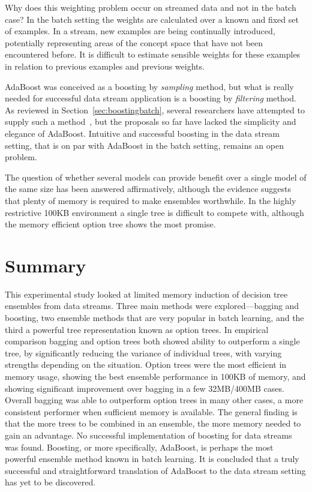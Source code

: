 Why does this weighting problem occur on streamed data and not in the batch case? In the batch setting the weights are calculated over a known and fixed set of examples. In a stream, new examples are being continually introduced, potentially representing areas of the concept space that have not been encountered before. It is difficult to estimate sensible weights for these examples in relation to previous examples and previous weights.

AdaBoost was conceived as a boosting by {\em sampling} method, but what is really needed for successful data stream application is a boosting by {\em filtering} method. As reviewed in Section~\ref{sec:boostingbatch}, several researchers have attempted to supply such a method~\cite{madaboost, polyboost}, but the proposals so far have lacked the simplicity and elegance of AdaBoost. Intuitive and successful boosting in the data stream setting, that is on par with AdaBoost in the batch setting, remains an open problem.

The question of whether several models can provide benefit over a single model of the same size has been answered affirmatively, although the evidence suggests that plenty of memory is required to make ensembles worthwhile. In the highly restrictive 100KB environment a single tree is difficult to compete with, although the memory efficient option tree shows the most promise.

\section{Summary}

This experimental study looked at limited memory induction of decision tree ensembles from data streams.
Three main methods were explored---bagging and boosting, two ensemble methods that are very popular in batch learning, and the third a powerful tree representation known as option trees.
In empirical comparison bagging and option trees both showed ability to outperform a single tree, by significantly reducing the variance of individual trees, with varying strengths depending on the situation. Option trees were the most efficient in memory usage, showing the best ensemble performance in 100KB of memory, and showing significant improvement over bagging in a few 32MB/400MB cases. Overall bagging was able to outperform option trees in many other cases, a more consistent performer when sufficient memory is available. The general finding is that the more trees to be combined in an ensemble, the more memory needed to gain an advantage.
No successful implementation of boosting for data streams was found.
Boosting, or more specifically, AdaBoost, is perhaps the most powerful ensemble method known in batch learning. It is concluded that a truly successful and straightforward translation of AdaBoost to the data stream setting has yet to be discovered.

